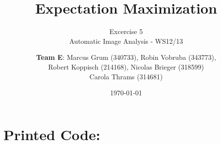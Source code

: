 \documentclass[a4paper,headings=small]{scrartcl}
\title{Expectation Maximization}
\subtitle{Excercise 5 \\ Automatic Image Analysis - WS12/13}
\author{\textbf{Team E}: Marcus Grum (340733), Robin Vobruba (343773), \\ Robert Koppisch (214168), Nicolas Brieger (318599)\\Carola Thrams (314681)}
\date{\today}
\numberwithin{equation}{section} %
\numberwithin{figure}{section}   %
\begin{document}
\maketitle





\newpage
\section{Printed Code:}


\end{document}
